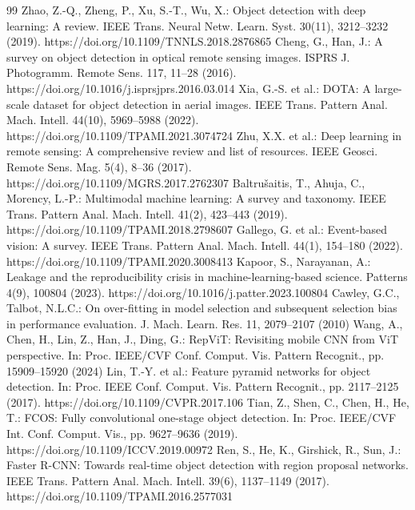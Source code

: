 \begin{thebibliography}{99}
 Zhao, Z.-Q., Zheng, P., Xu, S.-T., Wu, X.: Object detection with deep learning: A review. IEEE Trans. Neural Netw. Learn. Syst. 30(11), 3212--3232 (2019). https://doi.org/10.1109/TNNLS.2018.2876865
 Cheng, G., Han, J.: A survey on object detection in optical remote sensing images. ISPRS J. Photogramm. Remote Sens. 117, 11--28 (2016). https://doi.org/10.1016/j.isprsjprs.2016.03.014
 Xia, G.-S. et al.: DOTA: A large-scale dataset for object detection in aerial images. IEEE Trans. Pattern Anal. Mach. Intell. 44(10), 5969--5988 (2022). https://doi.org/10.1109/TPAMI.2021.3074724
 Zhu, X.X. et al.: Deep learning in remote sensing: A comprehensive review and list of resources. IEEE Geosci. Remote Sens. Mag. 5(4), 8--36 (2017). https://doi.org/10.1109/MGRS.2017.2762307
 Baltru\v{s}aitis, T., Ahuja, C., Morency, L.-P.: Multimodal machine learning: A survey and taxonomy. IEEE Trans. Pattern Anal. Mach. Intell. 41(2), 423--443 (2019). https://doi.org/10.1109/TPAMI.2018.2798607
 Gallego, G. et al.: Event-based vision: A survey. IEEE Trans. Pattern Anal. Mach. Intell. 44(1), 154--180 (2022). https://doi.org/10.1109/TPAMI.2020.3008413
 Kapoor, S., Narayanan, A.: Leakage and the reproducibility crisis in machine-learning-based science. Patterns 4(9), 100804 (2023). https://doi.org/10.1016/j.patter.2023.100804
 Cawley, G.C., Talbot, N.L.C.: On over-fitting in model selection and subsequent selection bias in performance evaluation. J. Mach. Learn. Res. 11, 2079--2107 (2010)
 Wang, A., Chen, H., Lin, Z., Han, J., Ding, G.: RepViT: Revisiting mobile CNN from ViT perspective. In: Proc. IEEE/CVF Conf. Comput. Vis. Pattern Recognit., pp. 15909--15920 (2024)
 Lin, T.-Y. et al.: Feature pyramid networks for object detection. In: Proc. IEEE Conf. Comput. Vis. Pattern Recognit., pp. 2117--2125 (2017). https://doi.org/10.1109/CVPR.2017.106
 Tian, Z., Shen, C., Chen, H., He, T.: FCOS: Fully convolutional one-stage object detection. In: Proc. IEEE/CVF Int. Conf. Comput. Vis., pp. 9627--9636 (2019). https://doi.org/10.1109/ICCV.2019.00972
 Ren, S., He, K., Girshick, R., Sun, J.: Faster R-CNN: Towards real-time object detection with region proposal networks. IEEE Trans. Pattern Anal. Mach. Intell. 39(6), 1137--1149 (2017). https://doi.org/10.1109/TPAMI.2016.2577031

\end{thebibliography}
